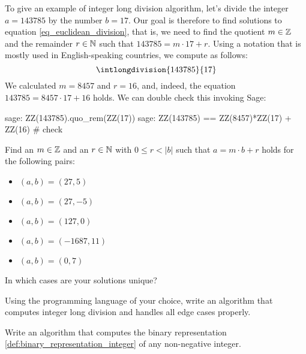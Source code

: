 \begin{example} To give an example of integer long division algorithm, let's divide the integer $a=143785$ by the number $b=17$. Our goal is therefore to find solutions to equation \ref{eq_euclidean_division}, that is, we need to find the quotient $m\in\mathbb{Z}$ and the remainder $r \in \mathbb{N}$ such that $143785 = m\cdot 17 + r$. Using a notation that is mostly used in English-speaking countries, we compute as follows:
\begin{equation}
\intlongdivision{143785}{17}
\end{equation}
We calculated $m=8457$ and $r=16$, and, indeed, the equation $143785 = 8457\cdot 17 + 16$ holds.  We can double check this invoking  Sage:
\begin{sagecommandline}
sage: ZZ(143785).quo_rem(ZZ(17))
sage: ZZ(143785) == ZZ(8457)*ZZ(17) + ZZ(16) # check
\end{sagecommandline}

\end{example}
\begin{exercise}
Find an $m\in\mathbb{Z}$ and an $r\in\mathbb{N}$ with $0\leq r< |b|$ such that $a= m\cdot b +r$ holds for the following pairs:
\begin{itemize}\compactlist{}
 \item $(a,b) = (27,5)$ 
 \item $(a,b)=(27,-5)$
 \item $(a,b)=(127,0)$
 \item $(a,b)= (-1687, 11)$
 \item $(a,b)= (0, 7)$
 \end{itemize}
 In which cases are your solutions unique?
\end{exercise}
\begin{exercise}
Using the programming language of your choice, write an algorithm that computes integer long division and handles all edge cases properly.
\end{exercise}
\begin{exercise}
Write an algorithm that computes the binary representation \ref{def:binary_representation_integer} of any non-negative integer.
\end{exercise}

